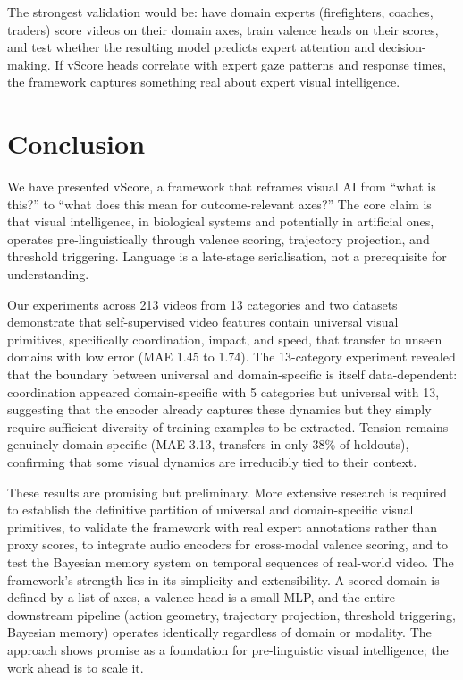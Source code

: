 \documentclass[11pt]{article}
\begin{document}
The strongest validation would be: have domain experts (firefighters, coaches, traders) score videos on their domain axes, train valence heads on their scores, and test whether the resulting model predicts expert attention and decision-making. If vScore heads correlate with expert gaze patterns and response times, the framework captures something real about expert visual intelligence.

\section{Conclusion}

We have presented vScore, a framework that reframes visual AI from ``what is this?'' to ``what does this mean for outcome-relevant axes?'' The core claim is that visual intelligence, in biological systems and potentially in artificial ones, operates pre-linguistically through valence scoring, trajectory projection, and threshold triggering. Language is a late-stage serialisation, not a prerequisite for understanding.

Our experiments across 213 videos from 13 categories and two datasets demonstrate that self-supervised video features contain universal visual primitives, specifically coordination, impact, and speed, that transfer to unseen domains with low error (MAE 1.45 to 1.74). The 13-category experiment revealed that the boundary between universal and domain-specific is itself data-dependent: coordination appeared domain-specific with 5 categories but universal with 13, suggesting that the encoder already captures these dynamics but they simply require sufficient diversity of training examples to be extracted. Tension remains genuinely domain-specific (MAE 3.13, transfers in only 38\% of holdouts), confirming that some visual dynamics are irreducibly tied to their context.

These results are promising but preliminary. More extensive research is required to establish the definitive partition of universal and domain-specific visual primitives, to validate the framework with real expert annotations rather than proxy scores, to integrate audio encoders for cross-modal valence scoring, and to test the Bayesian memory system on temporal sequences of real-world video. The framework's strength lies in its simplicity and extensibility. A scored domain is defined by a list of axes, a valence head is a small MLP, and the entire downstream pipeline (action geometry, trajectory projection, threshold triggering, Bayesian memory) operates identically regardless of domain or modality. The approach shows promise as a foundation for pre-linguistic visual intelligence; the work ahead is to scale it.
\end{document}
